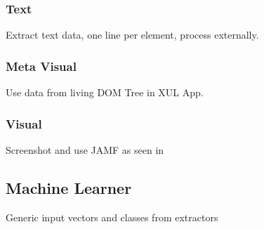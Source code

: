 \subsubsection{Text}

Extract text data, one line per element, process externally.

\subsubsection{Meta Visual}

Use data from living DOM Tree in XUL App.

\subsubsection{Visual}

Screenshot and use JAMF as seen in \cite{Steger08}

\subsection{Machine Learner}

Generic input vectors and classes from extractors

